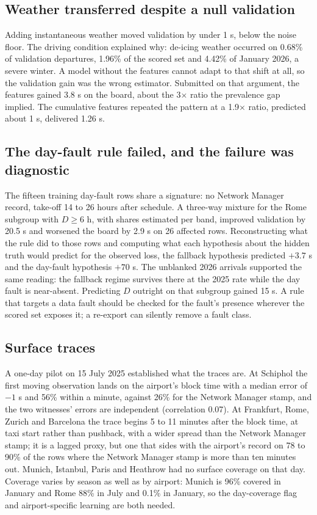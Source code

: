 \documentclass[
  manuscript=article,
  layout=preprint,
  year=2027,
  volume=x,
]{extra/joas}
\begin{document}
\subsection{Weather transferred despite a null validation}

Adding instantaneous weather moved validation by under 1 s, below the noise floor. The driving condition explained why: de-icing weather occurred on 0.68\% of validation departures, 1.96\% of the scored set and 4.42\% of January 2026, a severe winter. A model without the features cannot adapt to that shift at all, so the validation gain was the wrong estimator. Submitted on that argument, the features gained 3.8 s on the board, about the 3$\times$ ratio the prevalence gap implied. The cumulative features repeated the pattern at a 1.9$\times$ ratio, predicted about 1 s, delivered 1.26 s.

\subsection{The day-fault rule failed, and the failure was diagnostic}

The fifteen training day-fault rows share a signature: no Network Manager record, take-off 14 to 26 hours after schedule. A three-way mixture for the Rome subgroup with $D \ge 6$ h, with shares estimated per band, improved validation by 20.5 s and worsened the board by 2.9 s on 26 affected rows. Reconstructing what the rule did to those rows and computing what each hypothesis about the hidden truth would predict for the observed loss, the fallback hypothesis predicted $+3.7$ s and the day-fault hypothesis $+70$ s. The unblanked 2026 arrivals supported the same reading: the fallback regime survives there at the 2025 rate while the day fault is near-absent. Predicting $D$ outright on that subgroup gained 15 s. A rule that targets a data fault should be checked for the fault's presence wherever the scored set exposes it; a re-export can silently remove a fault class.

\subsection{Surface traces}

A one-day pilot on 15 July 2025 established what the traces are. At Schiphol the first moving observation lands on the airport's block time with a median error of $-1$ s and 56\% within a minute, against 26\% for the Network Manager stamp, and the two witnesses' errors are independent (correlation 0.07). At Frankfurt, Rome, Zurich and Barcelona the trace begins 5 to 11 minutes after the block time, at taxi start rather than pushback, with a wider spread than the Network Manager stamp; it is a lagged proxy, but one that sides with the airport's record on 78 to 90\% of the rows where the Network Manager stamp is more than ten minutes out. Munich, Istanbul, Paris and Heathrow had no surface coverage on that day. Coverage varies by season as well as by airport: Munich is 96\% covered in January and Rome 88\% in July and 0.1\% in January, so the day-coverage flag and airport-specific learning are both needed.
\end{document}
